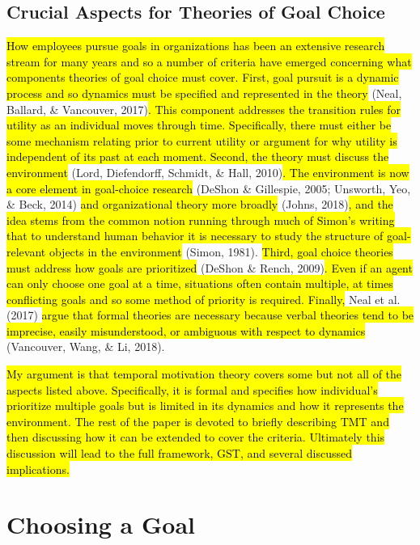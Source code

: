 \documentclass[english,,man]{apa6}
\theoremstyle{definition}
\theoremstyle{definition}
\theoremstyle{definition}
\theoremstyle{remark}
\begin{document}
\hypertarget{crucial-aspects-for-theories-of-goal-choice}{%
\subsection{Crucial Aspects for Theories of Goal
Choice}\label{crucial-aspects-for-theories-of-goal-choice}}

\hl{How employees pursue goals in organizations has been an extensive research stream for many years and so a number of criteria have emerged concerning what components theories of goal choice must cover. First, goal pursuit is a dynamic process and so dynamics must be specified and represented in the theory }(Neal,
Ballard, \& Vancouver,
2017)\hl{. This component addresses the transition rules for utility as an individual moves through time. Specifically, there must either be some mechanism relating prior to current utility or argument for why utility is independent of its past at each moment. Second, the theory must discuss the environment }(Lord,
Diefendorff, Schmidt, \& Hall,
2010)\hl{. The environment is now a core element in goal-choice research}
(DeShon \& Gillespie, 2005; Unsworth, Yeo, \& Beck,
2014)\hl{ and organizational theory more broadly} (Johns,
2018)\hl{, and the idea stems from the common notion running through much of Simon's writing that to understand human behavior it is necessary to study the structure of goal-relevant objects in the environment }(Simon,
1981).\hl{ Third, goal choice theories must address how goals are prioritized }(DeShon
\& Rench,
2009)\hl{. Even if an agent can only choose one goal at a time, situations often contain multiple, at times conflicting goals and so some method of priority is required. Finally, }Neal
et al.
(2017)\hl{ argue that formal theories are necessary because verbal theories tend to be imprecise, easily misunderstood, or ambiguous with respect to dynamics}
(Vancouver, Wang, \& Li, 2018).

\hl{My argument is that temporal motivation theory covers some but not all of the aspects listed above. Specifically, it is formal and specifies how individual's prioritize multiple goals but is limited in its dynamics and how it represents the environment. The rest of the paper is devoted to briefly describing TMT and then discussing how it can be extended to cover the criteria. Ultimately this discussion will lead to the full framework, GST, and several discussed implications. }

\hypertarget{choosing-a-goal}{%
\section{Choosing a Goal}\label{choosing-a-goal}}
\end{document}

